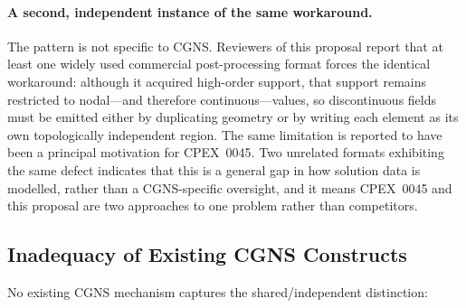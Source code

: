 \documentclass[11pt,letterpaper]{article}
\begin{document}
\paragraph{A second, independent instance of the same workaround.}
The pattern is not specific to CGNS.  Reviewers of this proposal report
that at least one widely used commercial post-processing format forces
the identical workaround: although it acquired high-order support, that
support remains restricted to nodal---and therefore continuous---values,
so discontinuous fields must be emitted either by duplicating geometry
or by writing each element as its own topologically independent region.
The same limitation is reported to have been a principal motivation for
CPEX~0045.  Two unrelated formats exhibiting the same defect indicates
that this is a general gap in how solution data is modelled, rather
than a CGNS-specific oversight, and it means CPEX~0045 and this
proposal are two approaches to one problem rather than competitors.

\subsection{Inadequacy of Existing CGNS Constructs}

No existing CGNS mechanism captures the shared/independent
distinction:
\end{document}
